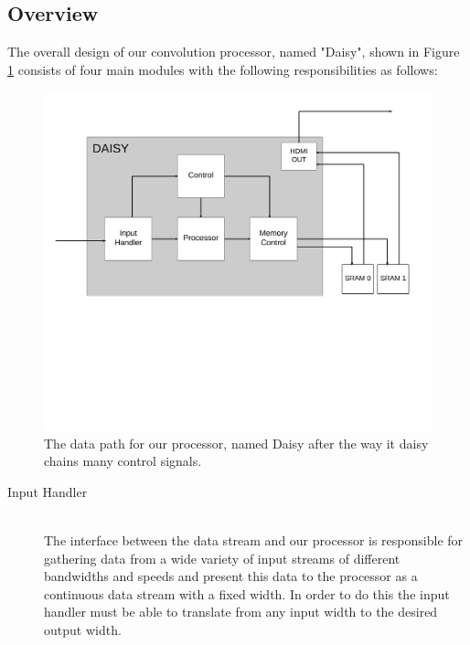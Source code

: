 \begin{Description}
\subsection{Overview}
The overall design of our convolution processor, named "Daisy", shown in Figure \ref{fig:Convolution} consists of four main modules with the following responsibilities as follows:
\begin{figure}[h!]
    \includegraphics[width=\linewidth]{img/daisy_overview.png}
    \caption{The data path for our processor, named Daisy after the way it daisy chains many control signals.}
    \label{fig:Convolution}
\end{figure}

\begin{description}
    \item[Input Handler] \hfill\\ 
        The interface between the data stream and our processor is responsible for gathering data from a wide variety of input streams of different bandwidths and speeds and present this data to the processor as a continuous data stream with a fixed width.
        In order to do this the input handler must be able to translate from any input width to the desired output width.


\end{description}
\end{Description}
